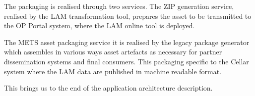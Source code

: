 	The packaging is realised through two services. The ZIP generation service, realised by the LAM transformation tool, prepares the asset to be transmitted to the OP Portal system, where the LAM online tool is deployed. 
	
	The METS\citep{mets} asset packaging service it is realised by the legacy
	package generator which assembles in various ways asset artefacts as necessary for
partner dissemination systems and final consumers. This packaging specific to the Cellar system where the LAM data are published in machine readable format. 
	
	This brings us to the end of the application architecture description.